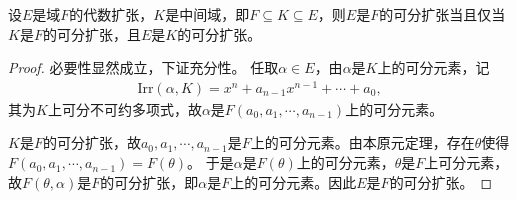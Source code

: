 \documentclass[../../main.tex]{subfiles}%
\begin{document}
\begin{theorem}
设$E$是域$F$的代数扩张，$K$是中间域，即$F\subseteq K\subseteq E$，则$E$是$F$的可分扩张当且仅当$K$是$F$的可分扩张，且$E$是$K$的可分扩张。
\end{theorem}
\begin{proof}
必要性显然成立，下证充分性。
任取$\alpha\in E$，由$\alpha$是$K$上的可分元素，记
\begin{align*}
\mathrm{Irr}(\alpha,K)=x^n+a_{n-1}x^{n-1}+\cdots+a_0,
\end{align*}
其为$K$上可分不可约多项式，故$\alpha$是$F(a_0,a_1,\cdots,a_{n-1})$上的可分元素。

$K$是$F$的可分扩张，故$a_0,a_1,\cdots,a_{n-1}$是$F$上的可分元素。由本原元定理，存在$\theta$使得$F(a_0,a_1,\cdots,a_{n-1})=F(\theta)$。
于是$\alpha$是$F(\theta)$上的可分元素，$\theta$是$F$上可分元素，故$F(\theta,\alpha)$是$F$的可分扩张，即$\alpha$是$F$上的可分元素。因此$E$是$F$的可分扩张。
\end{proof}
\end{document}
